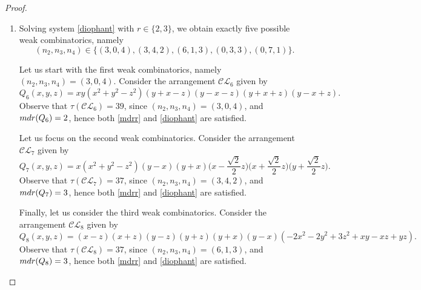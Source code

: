 \documentclass[12pt]{article}
\theoremstyle{plain}
\theoremstyle{definition}
\begin{document}
\begin{proof}
\begin{enumerate}
    Now we will show that the combinatorics $(n_{2},n_{3},n_{4}) = (2,4,1)$ cannot be realized geometrically. Note that if such an arrangement existed, then we would have a subarrangement with the property that one quadruple point, two triple points, one double point are located on a given conic, and one additional double intersection point is located away from the conic, and these are all intersections between our curves. To get two more triple intersections, we have to draw a line through the two double points, and we end up with a contradiction because we have two lines that intersect at two different points. 
    \item[($d=6$):] Solving system \eqref{diophant} with $r \in \{2,3\}$, we obtain exactly five possible weak combinatorics, namely 
    $$(n_{2},n_{3},n_{4}) \in \{(3,0,4),(3,4,2),(6,1,3),(0,3,3),(0,7,1)\}.$$ 
        
    Let us start with the first weak combinatorics, namely $(n_{2},n_{3},n_{4}) = (3,0,4)$. Consider the arrangement $\mathcal{CL}_{6}$ given by
    $$Q_{6}(x,y,z) =xy(x^2 + y^2 - z^2)(y+x-z)(y-x-z)(y+x+z)(y-x+z).$$
    Observe that $\tau(\mathcal{CL}_{6})=39$, since $(n_{2},n_{3},n_{4}) = (3,0,4)$, and ${\rm mdr}(Q_{6}) = 2$, hence both \eqref{mdrr} and \eqref{diophant} are satisfied.

    Let us focus on the second weak combinatorics. Consider the arrangement $\mathcal{CL}_{7}$ given by
     $$Q_{7}(x,y,z) =x(x^2 + y^2 - z^2)(y-x)(y+x)\bigg(x-\frac{\sqrt{2}}{2}z\bigg)\bigg(x+\frac{\sqrt{2}}{2}z\bigg)\bigg(y+\frac{\sqrt{2}}{2}z\bigg).$$
    Observe that $\tau(\mathcal{CL}_{7})=37$, since $(n_{2},n_{3},n_{4}) = (3,4,2)$, and ${\rm mdr}(Q_{7}) = 3$, hence both \eqref{mdrr} and \eqref{diophant} are satisfied.
    
    Finally, let us consider the third weak combinatorics. Consider the arrangement $\mathcal{CL}_{8}$ given by
    $$Q_{8}(x,y,z) = (x-z)(x+z)(y-z)(y+z)(y+x)(y-x)(-2x^2 -2y^2 + 3z^2 +xy -xz +yz).$$
    Observe that $\tau(\mathcal{CL}_{8})=37$, since $(n_{2},n_{3}, n_{4}) = (6,1,3)$, and ${\rm mdr}(Q_{8}) = 3$, hence both \eqref{mdrr} and \eqref{diophant} are satisfied.


\end{enumerate}
\end{proof}
\end{document}
